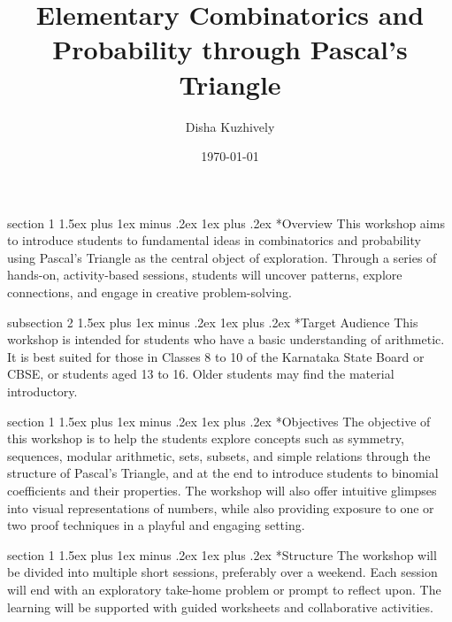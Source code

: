 \documentclass[a4paper,twoside,notitlepage,
11pt,
]{amsart}
\makeatletter
\renewcommand{\section}{\@startsection
  {section}%
  {1}%
  {\z@}%
  {1.5ex plus 1ex minus .2ex}%
  {1ex plus .2ex}%
  {\normalfont\bfseries}}%
\renewcommand{\subsection}{\@startsection
    {subsection}%
    {2}%
    {\z@}%
    {1.5ex plus 1ex minus .2ex}%
    {1ex plus .2ex}%
    {\normalfont\itshape}}%
\makeatother
\begin{document}
\title[Pascal's Triangle]{Elementary Combinatorics and Probability through Pascal's Triangle}
\author{Disha Kuzhively}
\address{\textit{International Centre for Theoretical Sciences - TIFR, Bangalore}}
\date{\today}
\maketitle
\section*{Overview}
This workshop aims to introduce students to fundamental ideas in combinatorics and probability using Pascal's Triangle as the central object of exploration. Through a series of hands-on, activity-based sessions, students will uncover patterns, explore connections, and engage in creative problem-solving.

\subsection*{Target Audience}
This workshop is intended for students who have a basic understanding of arithmetic. It is best suited for those in Classes 
8 to 10 of the Karnataka State Board or CBSE, or students aged 
13 to 16. Older students may find the material introductory.

\section*{Objectives}
The objective of this workshop is to help the students explore concepts such as symmetry, sequences, modular arithmetic, sets, subsets, and simple relations through the structure of Pascal's Triangle, and at the end to introduce students to binomial coefficients and their properties. The workshop will also offer intuitive glimpses into visual representations of numbers, while also providing exposure to one or two proof techniques in a playful and engaging setting.

\section*{Structure}
The workshop will be divided into multiple short sessions, preferably over a weekend. Each session will end with an exploratory take-home problem or prompt to reflect upon. The learning will be supported with guided worksheets and collaborative activities.
\end{document}
